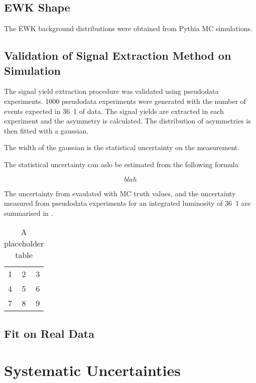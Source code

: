 \subsection{\ac{EWK} \ETm Shape}

The \ac{EWK} background \ETm distributions were obtained from Pythia \ac{MC}
simulations.


\subsection{Validation of Signal Extraction Method on Simulation}

The signal yield extraction procedure was validated using pseudodata
experiments. 1000 pseudodata experiments were generated with the number of
events expected in \unit{36.1}{\invpb} of data. The signal yields are extracted
in each experiment and the asymmetry is calculated. The distribution of
asymmetries is then fitted with a gaussian.

The width of the gaussian is the statistical uncertainty on the measurement.

The statistical uncertainty can aslo be estimated from the following formula

\begin{equation}
  blah
  \label{asym36:statuncert}
\end{equation}

The uncertainty from  evaulated with \ac{MC} truth
values, and the uncertainty measured from pseudodata experiments for an
integrated luminosity of \unit{36.1}{\invpb} are summarised in
.

\begin{table}[htb]
  \centering
  \begin{tabular}{| l c r |}
    \hline
    1 & 2 & 3 \\
    4 & 5 & 6 \\
    7 & 8 & 9 \\
  \hline
  \end{tabular}
  \caption{A placeholder table}
  \label{asym36:statuncertsum}
\end{table}

\subsection{Fit on Real Data}

\section{Systematic Uncertainties}
